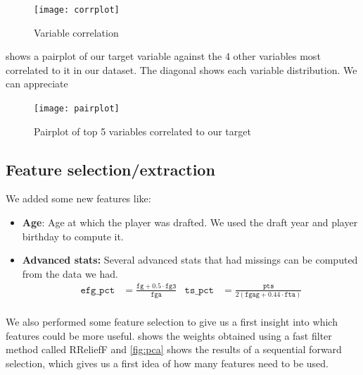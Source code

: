\begin{figure}[H]
  \texttt{[image: corrplot]}
  \caption{Variable correlation}%
  \label{fig:corrplot}
\end{figure}


 shows a pairplot of our target variable against the 4 other variables most
correlated to it in our dataset. The diagonal shows each variable distribution. We can appreciate

\begin{figure}[H]
    \texttt{[image: pairplot]}
    \caption{Pairplot of top 5 variables correlated to our target}
    \label{fig:pairplot}
\end{figure}

\subsection{Feature selection/extraction}%
\label{sub:feature-selection}

We added some new features like:
\begin{itemize}[topsep=0pt]
    \item \textbf{Age}: Age at which the player was drafted. We used the draft year and player birthday to compute it.
    \item \textbf{Advanced stats:} Several advanced stats that had missings can be computed from the data we had.
    \begin{align*}
    \texttt{efg\_pct} &= \frac{\texttt{fg} + 0.5 \cdot \texttt{fg3}}{\texttt{fga}}
  & \texttt{ts\_pct} &= \frac{\texttt{pts}}{2\left(\texttt{fgag} + 0.44 \cdot \texttt{fta}\right)} \\
    \end{align*}
\end{itemize}

We also performed some feature selection to give us a first insight into which features could be more useful.  shows the weights obtained using a fast filter method called RReliefF and \cref{fig:pca} shows the results of a sequential forward selection, which gives us a first idea of how many features need to be used.

